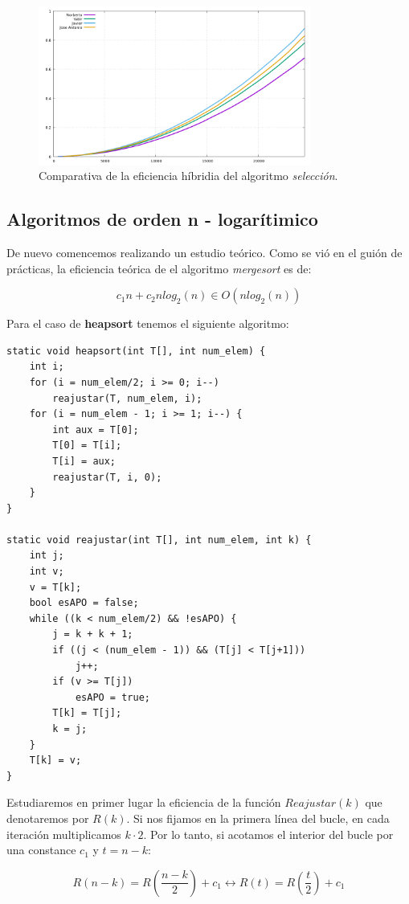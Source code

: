\documentclass[11pt,a4paper]{article}
\begin{document}
\begin{figure}[H]
	\centering
	\includegraphics[width=0.8\textwidth]{../plots/seleccion}
	\caption{Comparativa de la eficiencia híbridia del algoritmo \emph{selección}.}
\end{figure}

\subsection{Algoritmos de orden n - logarítimico}

De nuevo comencemos realizando un estudio teórico. Como se vió en el guión de prácticas, la eficiencia teórica de el algoritmo \emph{mergesort} es de:

$$c_1n + c_2nlog_2(n) \in O(nlog_2(n))$$

Para el caso de \textbf{heapsort} tenemos el siguiente algoritmo:

\begin{lstlisting}
static void heapsort(int T[], int num_elem) {
	int i;
	for (i = num_elem/2; i >= 0; i--)
		reajustar(T, num_elem, i);
	for (i = num_elem - 1; i >= 1; i--) {
		int aux = T[0];
		T[0] = T[i];
		T[i] = aux;
		reajustar(T, i, 0);
	}
}

static void reajustar(int T[], int num_elem, int k) {
	int j;
	int v;
	v = T[k];
	bool esAPO = false;
	while ((k < num_elem/2) && !esAPO) {
		j = k + k + 1;
		if ((j < (num_elem - 1)) && (T[j] < T[j+1]))
			j++;
		if (v >= T[j])
			esAPO = true;
		T[k] = T[j];
		k = j;
	}
	T[k] = v;
}
\end{lstlisting}

Estudiaremos en primer lugar la eficiencia de la función $Reajustar(k)$ que denotaremos por $R(k)$. Si nos fijamos en la primera línea del bucle, en cada iteración multiplicamos $k \cdot 2$. Por lo tanto, si acotamos el interior del bucle por una constance $c_1$ y $ t = n-k$:

$$R(n-k) = R(\frac{n-k}{2}) + c_1 \leftrightarrow R(t) = R(\frac{t}{2}) + c_1$$
\end{document}

